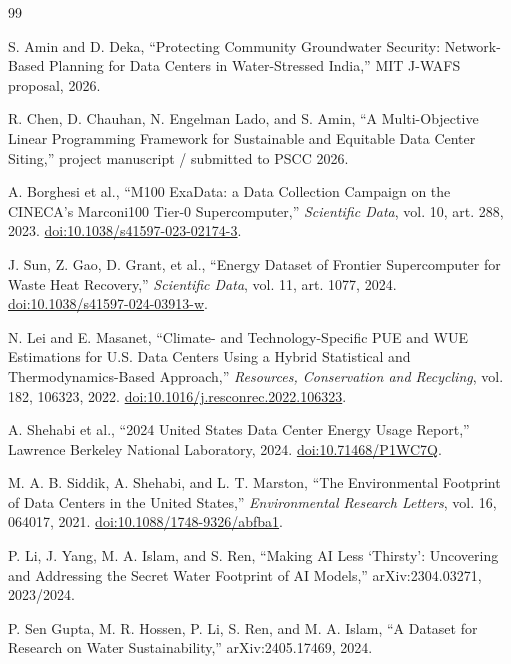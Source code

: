 \documentclass[11pt]{article}
\begin{document}
\begin{thebibliography}{99}\small

S. Amin and D. Deka,
``Protecting Community Groundwater Security: Network-Based Planning for Data Centers in Water-Stressed India,''
MIT J-WAFS proposal, 2026.

R. Chen, D. Chauhan, N. Engelman Lado, and S. Amin,
``A Multi-Objective Linear Programming Framework for Sustainable and Equitable Data Center Siting,''
project manuscript / submitted to PSCC 2026.

A. Borghesi et al.,
``M100 ExaData: a Data Collection Campaign on the CINECA's Marconi100 Tier-0 Supercomputer,''
\emph{Scientific Data}, vol. 10, art. 288, 2023.
\href{https://doi.org/10.1038/s41597-023-02174-3}{doi:10.1038/s41597-023-02174-3}.

J. Sun, Z. Gao, D. Grant, et al.,
``Energy Dataset of Frontier Supercomputer for Waste Heat Recovery,''
\emph{Scientific Data}, vol. 11, art. 1077, 2024.
\href{https://doi.org/10.1038/s41597-024-03913-w}{doi:10.1038/s41597-024-03913-w}.

N. Lei and E. Masanet,
``Climate- and Technology-Specific PUE and WUE Estimations for U.S. Data Centers Using a Hybrid Statistical and Thermodynamics-Based Approach,''
\emph{Resources, Conservation and Recycling}, vol. 182, 106323, 2022.
\href{https://doi.org/10.1016/j.resconrec.2022.106323}{doi:10.1016/j.resconrec.2022.106323}.

A. Shehabi et al.,
``2024 United States Data Center Energy Usage Report,''
Lawrence Berkeley National Laboratory, 2024.
\href{https://doi.org/10.71468/P1WC7Q}{doi:10.71468/P1WC7Q}.

M. A. B. Siddik, A. Shehabi, and L. T. Marston,
``The Environmental Footprint of Data Centers in the United States,''
\emph{Environmental Research Letters}, vol. 16, 064017, 2021.
\href{https://doi.org/10.1088/1748-9326/abfba1}{doi:10.1088/1748-9326/abfba1}.

P. Li, J. Yang, M. A. Islam, and S. Ren,
``Making AI Less `Thirsty': Uncovering and Addressing the Secret Water Footprint of AI Models,''
arXiv:2304.03271, 2023/2024.

P. Sen Gupta, M. R. Hossen, P. Li, S. Ren, and M. A. Islam,
``A Dataset for Research on Water Sustainability,''
arXiv:2405.17469, 2024.


\end{thebibliography}
\end{document}
